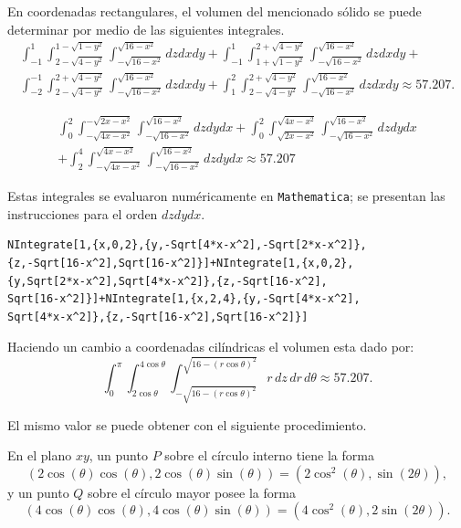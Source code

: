 En coordenadas rectangulares, el volumen del mencionado sólido se puede determinar por medio de las siguientes integrales.
{\small
\begin{multline*}
\int_{-1}^{1}\int_{2-\sqrt{4-y^2}}^{1-\sqrt{1-y^2}}\int_{-\sqrt{16-x^2}}^{\sqrt{16-x^2}}dzdxdy+\int_{-1}^{1}\int_{1+\sqrt{1-y^2}}^{2+\sqrt{4-y^2}}\int_{-\sqrt{16-x^2}}^{\sqrt{16-x^2}}dzdxdy+\\
\int_{-2}^{-1}\int_{2-\sqrt{4-y^2}}^{2+\sqrt{4-y^2}}\int_{-\sqrt{16-x^2}}^{\sqrt{16-x^2}}dzdxdy+\int_{1}^2\int_{2-\sqrt{4-y^2}}^{2+\sqrt{4-y^2}}\int_{-\sqrt{16-x^2}}^{\sqrt{16-x^2}}dzdxdy \approx 57.207.
\end{multline*}
}

{\small
\begin{multline*}
\int_{0}^2\int_{-\sqrt{4x-x^2}}^{-\sqrt{2x-x^2}}\int_{-\sqrt{16-x^2}}^{\sqrt{16-x^2}}dzdydx+\int_{0}^2\int_{\sqrt{2x-x^2}}^{\sqrt{4x-x^2}}\int_{-\sqrt{16-x^2}}^{\sqrt{16-x^2}}dzdydx\\
+\int_{2}^{4}\int_{-\sqrt{4x-x^2}}^{\sqrt{4x-x^2}}\int_{-\sqrt{16-x^2}}^{\sqrt{16-x^2}}dzdydx \approx 57.207
\end{multline*}
}

Estas integrales se evaluaron numéricamente en \verb"Mathematica";
se presentan las instrucciones para el orden $dzdydx$.

\begin{tcolorbox}[title=\bf Instrucción en \verb"Mathematica"]\begin{Verbatim}[formatcom=\letraverbatim]
NIntegrate[1,{x,0,2},{y,-Sqrt[4*x-x^2],-Sqrt[2*x-x^2]},
{z,-Sqrt[16-x^2],Sqrt[16-x^2]}]+NIntegrate[1,{x,0,2},
{y,Sqrt[2*x-x^2],Sqrt[4*x-x^2]},{z,-Sqrt[16-x^2],
Sqrt[16-x^2]}]+NIntegrate[1,{x,2,4},{y,-Sqrt[4*x-x^2],
Sqrt[4*x-x^2]},{z,-Sqrt[16-x^2],Sqrt[16-x^2]}]
\end{Verbatim}
\end{tcolorbox}

Haciendo un cambio a coordenadas cilíndricas el volumen esta dado por:
%
\[
\int_{0}^{\pi} \int_{2 \cos \theta}^{4 \cos \theta} \int_{-\sqrt{16-(r \cos \theta)^{2}}}^{\sqrt{16-(r \cos \theta)^{2}}} r\,dz\,dr\,d\theta \approx 57.207.
\]
%

El mismo valor se puede obtener con el siguiente procedimiento.


En el plano $xy$, un punto $P$ sobre el círculo interno tiene la forma
{\small
\[\left( 2\cos (\theta) \cos (\theta) ,2\cos (\theta) \sin (\theta) \right) = (2 \cos^2 (\theta), \sin(2\theta)),\]}
y un punto $Q$ sobre el círculo mayor posee la forma
{\small
\[\left( 4\cos (\theta) \cos (\theta) ,4\cos \left(
\theta \right) \sin (\theta) \right) = (4 \cos^2 (\theta), 2\sin(2\theta)).\]}

